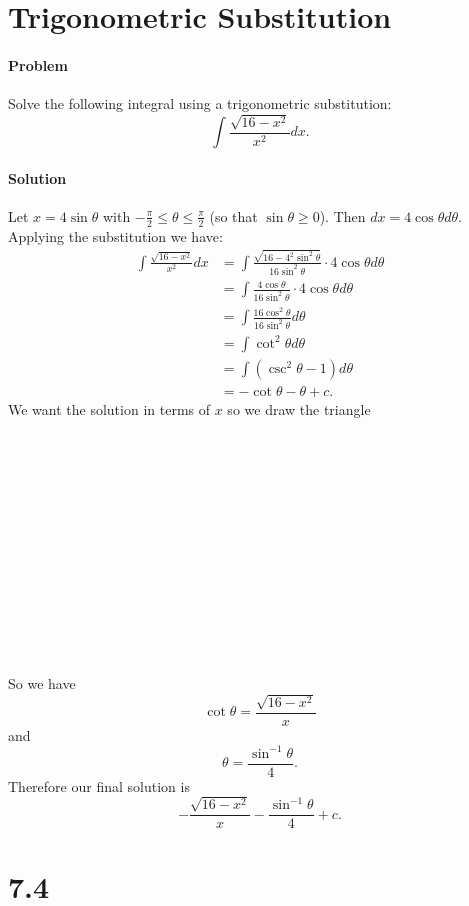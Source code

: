\documentclass[letterpaper,12pt,oneside,onecolumn]{article}
\begin{document}
\section*{Trigonometric Substitution}
\paragraph{Problem}
Solve the following integral using a trigonometric substitution:
$$\int \frac{\sqrt{16-x^2}}{x^2}dx.$$
\paragraph{Solution}
Let $x = 4\sin\theta$ with $-\frac{\pi}2 \leq \theta \leq \frac{\pi}{2}$ (so that $\sin\theta \geq 0$). Then $dx = 4\cos\theta d\theta$. Applying the substitution we have: 
\begin{align*}
\int \frac{\sqrt{16-x^2}}{x^2}dx &= \int\frac{\sqrt{16-4^2\sin^2\theta}}{16\sin^2\theta}\cdot 4\cos\theta d\theta \\
&=\int\frac{4\cos\theta}{16\sin^2\theta} \cdot 4\cos\theta d\theta \\
&=\int\frac{16\cos^2\theta}{16\sin^2\theta}d\theta\\
&=\int\cot^2\theta d\theta \\
&=\int(\csc^2\theta - 1) d\theta \\
&= -\cot\theta - \theta + c.
\end{align*}
We want the solution in terms of $x$ so we draw the triangle \\\\\\\\\\\\\\\\\\\\\\\\\\\\
So we have $$\cot\theta = \frac{\sqrt{16-x^2}}{x}$$ and $$\theta = \frac{\sin^{-1}\theta}{4}.$$
Therefore our final solution is
$$-\frac{\sqrt{16-x^2}}{x} - \frac{\sin^{-1}\theta}{4} + c.$$
\section*{7.4}
\end{document}
